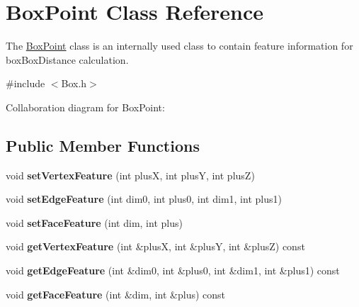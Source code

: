 \hypertarget{class_box_point}{\section{Box\+Point Class Reference}
\label{class_box_point}
}


The \hyperlink{class_box_point}{Box\+Point} class is an internally used class to contain feature information for box\+Box\+Distance calculation.  




{\ttfamily \#include $<$Box.\+h$>$}



Collaboration diagram for Box\+Point\+:
\subsection*{Public Member Functions}
\begin{DoxyCompactItemize}
\item 
\hypertarget{class_box_point_a98fe8f354c6cb170691007c0b8722761}{void {\bfseries set\+Vertex\+Feature} (int plus\+X, int plus\+Y, int plus\+Z)}\label{class_box_point_a98fe8f354c6cb170691007c0b8722761}

\item 
\hypertarget{class_box_point_a2cec737b3f0272457ee8230cf9319d4b}{void {\bfseries set\+Edge\+Feature} (int dim0, int plus0, int dim1, int plus1)}\label{class_box_point_a2cec737b3f0272457ee8230cf9319d4b}

\item 
\hypertarget{class_box_point_a836df69f314b2b51c2186cff9f151ea9}{void {\bfseries set\+Face\+Feature} (int dim, int plus)}\label{class_box_point_a836df69f314b2b51c2186cff9f151ea9}

\item 
\hypertarget{class_box_point_ad9a0db1d891c5b3cc4cd0343eb4fae63}{void {\bfseries get\+Vertex\+Feature} (int \&plus\+X, int \&plus\+Y, int \&plus\+Z) const }\label{class_box_point_ad9a0db1d891c5b3cc4cd0343eb4fae63}

\item 
\hypertarget{class_box_point_a8696a9f32720b60e0e32bad0352cc93e}{void {\bfseries get\+Edge\+Feature} (int \&dim0, int \&plus0, int \&dim1, int \&plus1) const }\label{class_box_point_a8696a9f32720b60e0e32bad0352cc93e}

\item 
\hypertarget{class_box_point_a54d0e72b3c166a12f35e245503130e03}{void {\bfseries get\+Face\+Feature} (int \&dim, int \&plus) const }\label{class_box_point_a54d0e72b3c166a12f35e245503130e03}

\end{DoxyCompactItemize}
